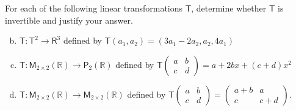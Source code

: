 For each of the following linear transformations $\mathsf{T}$,
determine whether $\mathsf{T}$ is invertible and justify your answer.
\begin{enumerate}[(a)]
\setcounter{enumii}{1}
\item $\mathsf{T}\colon \mathsf{T}^2 \to \mathsf{R}^3$ defined by
  $\mathsf{T}(a_1,a_2) = (3a_1-2a_2,a_2,4a_1)$
\setcounter{enumii}{4}
\item $\mathsf{T}\colon \mathsf{M}_{2\times 2}(\mathbb{R}) \to \mathsf{P}_2(\mathbb{R})$ defined by $\mathsf{T}\begin{pmatrix}a&b\\c&d
  \end{pmatrix} = a + 2bx + (c+d)x^2$
\item $\mathsf{T}\colon \mathsf{M}_{2\times 2}(\mathbb{R}) \to
  \mathsf{M}_{2\times 2}(\mathbb{R})$ defined by $\mathsf{T}\begin{pmatrix}a&b\\c&d
  \end{pmatrix} = \begin{pmatrix} a+b& a\\ c & c+d
  \end{pmatrix}$.
\end{enumerate}
